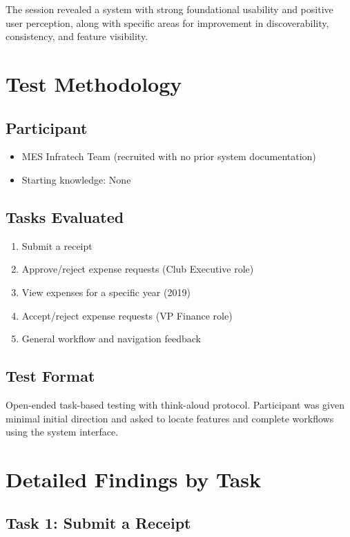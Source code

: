 \documentclass[12pt, titlepage]{article}
\begin{document}
The session revealed a system with strong foundational usability and positive user perception, along with specific areas for improvement in discoverability, consistency, and feature visibility.

\section{Test Methodology}

\subsection{Participant}
\begin{itemize}
    \item MES Infratech Team (recruited with no prior system documentation)
    \item Starting knowledge: None
\end{itemize}

\subsection{Tasks Evaluated}
\begin{enumerate}
    \item Submit a receipt
    \item Approve/reject expense requests (Club Executive role)
    \item View expenses for a specific year (2019)
    \item Accept/reject expense requests (VP Finance role)
    \item General workflow and navigation feedback
\end{enumerate}

\subsection{Test Format}
Open-ended task-based testing with think-aloud protocol. Participant was given minimal initial direction and asked to locate features and complete workflows using the system interface.

\section{Detailed Findings by Task}

\subsection{Task 1: Submit a Receipt}
\end{document}
